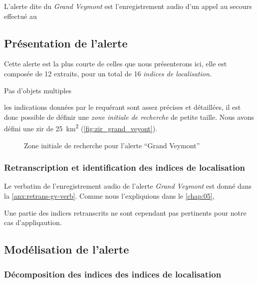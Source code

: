 L'alerte dite du \emph{Grand Veymont} est l'enregistrement audio d'un
appel au secours effectué au 

\subsection{Présentation de l'alerte}
\label{subsec:9-2-1}

Cette alerte est la plus courte de celles que nous présenterons ici,
elle est composée de 12 extraits, pour un total de 16 \emph{indices de
  localisation.}

Pas d'objets multiples

les indications données par le requérant sont assez précises et
détaillées, il est donc possible de définir une \emph{zone initiale de
  recherche} de petite taille. Nous avons défini une \ac{zir} de
\SI{25}{\kilo\meter\squared} (\autoref{fig:zir_grand_veyont}).

\begin{figure}
  \centering
  
  \caption{Zone initiale de recherche pour l'alerte \enquote{Grand Veymont}}
  \label{fig:zir_grand_veyont}
\end{figure}


\subsubsection{Retranscription et identification des indices de localisation}
\label{subsec:9-2-1-1}


Le verbatim de l'enregistrement audio de l'alerte \emph{Grand Veymont}
est donné dans la \autoref{anx:retrans-gv-verb}.
%
Comme nous l’expliquions dans le \autoref{chap:05}, 


Une partie des indices retranscrits ne sont cependant pas pertinents
pour notre cas d'appliqaution.







\subsection{Modélisation de l'alerte}
\label{subsec:9-2-2}


\subsubsection{Décomposition des indices des indices de localisation}
\label{subsec:9-2-2-2}


